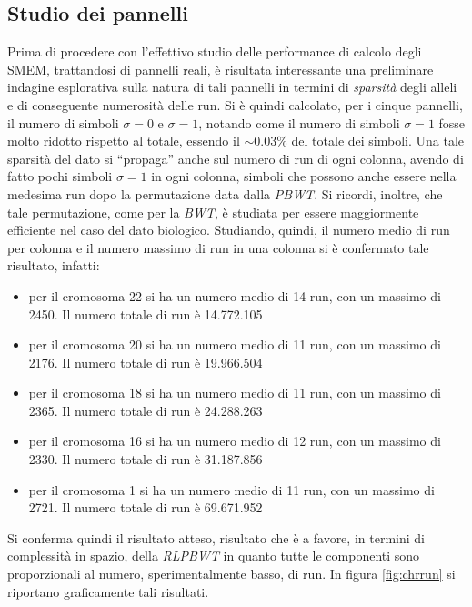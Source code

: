 \subsection{Studio dei pannelli}
Prima di procedere con l'effettivo studio delle performance di calcolo degli
SMEM, trattandosi di pannelli reali, è risultata interessante una preliminare
indagine esplorativa sulla natura di tali pannelli in termini di
\textit{sparsità} degli alleli e di conseguente numerosità delle run. Si è
quindi calcolato, per i cinque pannelli, il numero di simboli $\sigma=0$ e
$\sigma=1$, notando come il numero di simboli $\sigma=1$ fosse molto ridotto
rispetto al totale, essendo il $\sim 0.03\%$ del totale dei simboli. Una tale
sparsità del dato si ``propaga'' anche sul numero di run di ogni colonna, avendo
di fatto pochi simboli $\sigma=1$ in ogni colonna, simboli che possono anche
essere nella medesima run dopo la permutazione data dalla
\textit{PBWT}. Si ricordi, inoltre, che tale permutazione, come per la
\textit{BWT}, è studiata per essere 
maggiormente efficiente nel caso del dato biologico. Studiando, quindi, il
numero medio di run per colonna e il numero 
massimo di run in una colonna si è confermato tale risultato, infatti:
\begin{itemize}
  \item per il cromosoma 22 si ha un numero medio di 14 run, con un massimo di
  2450. Il numero totale di run è 14.772.105
  \item per il cromosoma 20 si ha un numero medio di 11 run, con un massimo di
  2176. Il numero totale di run è 19.966.504
  \item per il cromosoma 18 si ha un numero medio di 11 run, con un massimo di
  2365. Il numero totale di run è 24.288.263
  \item per il cromosoma 16 si ha un numero medio di 12 run, con un massimo di
  2330. Il numero totale di run è 31.187.856
  \item per il cromosoma 1 si ha un numero medio di 11 run, con un massimo di
  2721. Il numero totale di run è 69.671.952
\end{itemize}
Si conferma quindi il risultato atteso, risultato che è a favore, in termini di
complessità in spazio, della \textit{RLPBWT} in quanto tutte le componenti sono
proporzionali al numero, sperimentalmente basso, di run. In figura
\ref{fig:chrrun} si riportano graficamente tali risultati.
